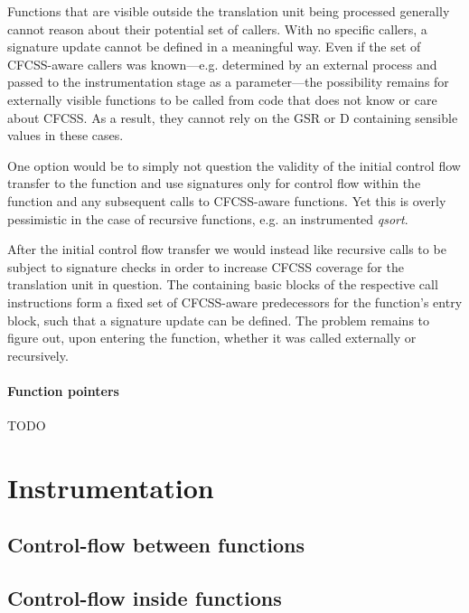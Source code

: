 Functions that are visible outside the translation unit being processed
generally cannot reason about their potential set of callers. With no specific
callers, a signature update cannot be defined in a meaningful way. Even if the
set of CFCSS-aware callers was known—e.g. determined by an external
process and passed to the instrumentation stage as a parameter—the possibility
remains for externally visible functions to be called from code that does not
know or care about CFCSS. As a result, they cannot rely on the GSR or
D containing sensible values in these cases.

One option would be to simply not question the validity of the initial control
flow transfer to the function and use signatures only for control flow within
the function and any subsequent calls to CFCSS-aware functions. Yet this is
overly pessimistic in the case of recursive functions, e.g. an instrumented
\emph{qsort}.

After the initial control flow transfer we would instead like recursive calls
to be subject to signature checks in order to increase CFCSS coverage for the
translation unit in question. The containing basic blocks of the respective
call instructions form a fixed set of CFCSS-aware predecessors for the
function's entry block, such that a signature update can be defined. The
problem remains to figure out, upon entering the function, whether it was
called externally or recursively.


\paragraph{Function pointers} TODO


\section{Instrumentation}


\subsection{Control-flow between functions}


\subsection{Control-flow inside functions}

